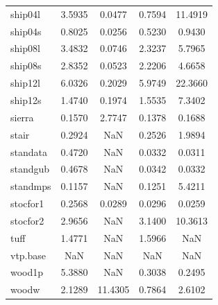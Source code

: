 \begin{longtable}{lcccc}
ship04l  &   3.5935 &   0.0477 &   0.7594 &  11.4919 \\
ship04s  &   0.8025 &   0.0256 &   0.5230 &   0.9430 \\
ship08l  &   3.4832 &   0.0746 &   2.3237 &   5.7965 \\
ship08s  &   2.8352 &   0.0523 &   2.2206 &   4.6658 \\
ship12l  &   6.0326 &   0.2029 &   5.9749 &  22.3660 \\
ship12s  &   1.4740 &   0.1974 &   1.5535 &   7.3402 \\
sierra   &   0.1570 &   2.7747 &   0.1378 &   0.1688 \\
stair    &   0.2924 &      NaN &   0.2526 &   1.9894 \\
standata &   0.4720 &      NaN &   0.0332 &   0.0311 \\
standgub &   0.4678 &      NaN &   0.0342 &   0.0332 \\
standmps &   0.1157 &      NaN &   0.1251 &   5.4211 \\
stocfor1 &   0.2568 &   0.0289 &   0.0296 &   0.0259 \\
stocfor2 &   2.9656 &      NaN &   3.1400 &  10.3613 \\
tuff     &   1.4771 &      NaN &   1.5966 &      NaN \\
vtp.base &      NaN &      NaN &      NaN &      NaN \\
wood1p   &   5.3880 &      NaN &   0.3038 &   0.2495 \\
woodw    &   2.1289 &  11.4305 &   0.7864 &   2.6102 \\
\end{longtable}
